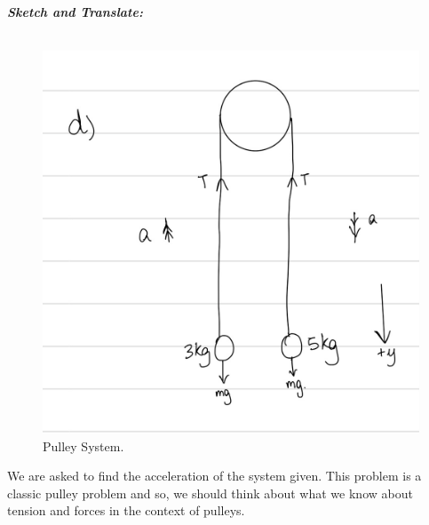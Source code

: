 \begin{subquestions}
	\textbf{\textit{Sketch and Translate:}} \\ \\
	\begin{figure}[H]
		\begin{center}
			\includegraphics[scale=0.25]{../2015/figures/2015q6-4}
			\caption{\label{2015:q66:fig:Sketch4} Pulley System.}
		\end{center}
	\end{figure}	
	We are asked to find the acceleration of the system given. This problem is a classic pulley problem and so, we should think about what we know about tension and forces in the context of pulleys.
	
	
	

\end{subquestions}
